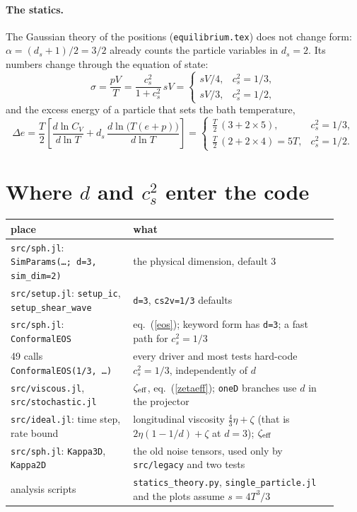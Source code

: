\documentclass[11pt,aps,preprint,nofootinbib,superscriptaddress,tightenlines]{revtex4-2}
\def\st{\begin{equation}}
\def\stp{\end{equation}}
\def\Eq#1{eq.~(\ref{#1})}
\let\oldparagraph\paragraph
\renewcommand{\paragraph}{\par\bigskip\oldparagraph}
\begin{document}
\paragraph{The statics.}  The Gaussian theory of the positions (\texttt{equilibrium.tex}) does not change form: $\alpha=(d_s+1)/2=3/2$
already counts the particle variables in $d_s=2$.  Its numbers change through the equation of state:
\st
\sigma=\frac{pV}{T}=\frac{c_s^2}{1+c_s^2}\,s V=\begin{cases}sV/4, & c_s^2=1/3,\\ sV/3, & c_s^2=1/2,\end{cases}
\stp
and the excess energy of a particle that sets the bath temperature,
\st
\Delta e=\frac{T}{2}\left[\frac{d\ln C_V}{d\ln T}+d_s\,\frac{d\ln\bigl(T(e+p)\bigr)}{d\ln T}\right]=
\begin{cases}\frac T2\,(3+2\times5), & c_s^2=1/3,\\[2pt] \frac T2\,(2+2\times4)=5T, & c_s^2=1/2 .\end{cases}
\stp

\section{Where $d$ and $c_s^2$ enter the code}

\begin{center}
\begin{tabular}{p{0.34\linewidth}p{0.58\linewidth}}
\toprule
place & what \\
\midrule
\texttt{src/sph.jl}: \texttt{SimParams(\dots; d=3, sim\_dim=2)} & the physical dimension, default 3 \\
\texttt{src/setup.jl}: \texttt{setup\_ic}, \texttt{setup\_shear\_wave} & \texttt{d=3}, \texttt{cs2v=1/3} defaults \\
\texttt{src/sph.jl}: \texttt{ConformalEOS} & \Eq{eos}; keyword form has \texttt{d=3}; a fast path for $c_s^2=1/3$ \\
49 calls \texttt{ConformalEOS(1/3,\,\dots)} & every driver and most tests hard-code $c_s^2=1/3$, independently of $d$ \\
\texttt{src/viscous.jl}, \texttt{src/stochastic.jl} & $\zeta_{\rm eff}$, \Eq{zetaeff}; \texttt{oneD} branches use $d$ in the projector \\
\texttt{src/ideal.jl}: time step, rate bound & longitudinal viscosity $\tfrac43\eta+\zeta$ (that is $2\eta(1-1/d)+\zeta$ at $d=3$); $\zeta_{\rm eff}$ \\
\texttt{src/sph.jl}: \texttt{Kappa3D}, \texttt{Kappa2D} & the old noise tensors, used only by \texttt{src/legacy} and two tests \\
analysis scripts & \texttt{statics\_theory.py}, \texttt{single\_particle.jl} and the plots assume $s=4T^3/3$ \\
\bottomrule
\end{tabular}
\end{center}
\end{document}
